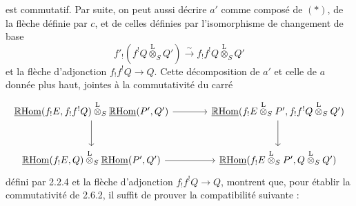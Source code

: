 \documentclass[11pt]{article}
\newcommand{\R}{\mathbb{R}}\newcommand{\RHomCore}{\mathbb{R}\mathrm{Hom}}
\providecommand{\RHom}{\RHomCore}
\providecommand{\uRHom}{\underline{\RHom}}
\providecommand{\RHom}{\RHomCore}
\providecommand{\RHom}{\R\mathcal{H}om}
\providecommand{\R}{\mathrm R}
\providecommand{\RHom}{\RHomCore}
\begin{document}
est commutatif. Par suite, on peut aussi décrire $a'$ comme composé de $(*)$, de la flèche définie par $c$, et de celles définies par l'isomorphisme de changement de base
\[
f'_!(f^!Q\overset{\mathrm{L}}{\otimes}_SQ')\xrightarrow{\sim}f_!f^!Q\overset{\mathrm{L}}{\otimes}_SQ'
\]
et la flèche d'adjonction $f_!f^!Q\to Q$. Cette décomposition de $a'$ et celle de $a$ donnée plus haut, jointes à la commutativité du carré
\[
\begin{tikzcd}[column sep=
large,row sep=large]
\uRHom(f_!E,f_!f^!Q)\overset{\mathrm{L}}{\otimes}_S\uRHom(P',Q') \arrow[r] \arrow[d] & \uRHom(f_!E\overset{\mathrm{L}}{\otimes}_SP',f_!f^!Q\overset{\mathrm{L}}{\otimes}_SQ') \arrow[d]\\
\uRHom(f_!E,Q)\overset{\mathrm{L}}{\otimes}_S\uRHom(P',Q') \arrow[r] & \uRHom(f_!E\overset{\mathrm{L}}{\otimes}_SP',Q\overset{\mathrm{L}}{\otimes}_SQ')
\end{tikzcd}
\]
défini par 2.2.4 et la flèche d'adjonction $f_!f^!Q\to Q$, montrent que, pour établir la commutativité de 2.6.2, il suffit de prouver la compatibilité suivante :
\end{document}
